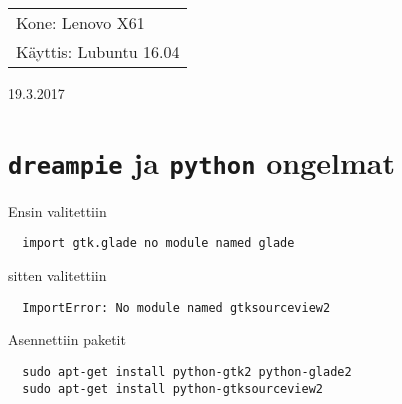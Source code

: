 \documentclass[main.tex]{subfiles}
\begin{document}
\thispagestyle{empty}
\begin{tabular}[t]{l}
Kone: Lenovo X61\\
Käyttis: Lubuntu 16.04
\end{tabular}
\hfill 19.3.2017

\section{\texttt{dreampie} ja \texttt{python} ongelmat}

Ensin valitettiin

\begin{lstlisting}
  import gtk.glade no module named glade
\end{lstlisting}

sitten valitettiin

\begin{lstlisting}
  ImportError: No module named gtksourceview2
\end{lstlisting}

Asennettiin paketit

\begin{lstlisting}
  sudo apt-get install python-gtk2 python-glade2
  sudo apt-get install python-gtksourceview2
\end{lstlisting}
\end{document}
